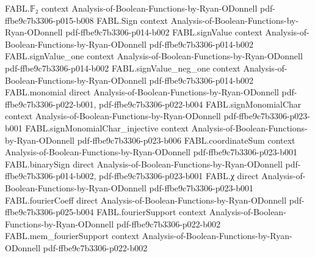 \begin{theorem}
\label{FABL.restrictedWidth_ge_probability_le}
\leanok
{}
\proofstep
  {FABL.𝔽₂}
  {context}
  {Analysis-of-Boolean-Functions-by-Ryan-ODonnell}
  {pdf-ffbe9c7b3306-p015-b008}
\proofstep
  {FABL.Sign}
  {context}
  {Analysis-of-Boolean-Functions-by-Ryan-ODonnell}
  {pdf-ffbe9c7b3306-p014-b002}
\proofstep
  {FABL.signValue}
  {context}
  {Analysis-of-Boolean-Functions-by-Ryan-ODonnell}
  {pdf-ffbe9c7b3306-p014-b002}
\proofstep
  {FABL.signValue_one}
  {context}
  {Analysis-of-Boolean-Functions-by-Ryan-ODonnell}
  {pdf-ffbe9c7b3306-p014-b002}
\proofstep
  {FABL.signValue_neg_one}
  {context}
  {Analysis-of-Boolean-Functions-by-Ryan-ODonnell}
  {pdf-ffbe9c7b3306-p014-b002}
\proofstep
  {FABL.monomial}
  {direct}
  {Analysis-of-Boolean-Functions-by-Ryan-ODonnell}
  {pdf-ffbe9c7b3306-p022-b001,
    pdf-ffbe9c7b3306-p022-b004}
\proofstep
  {FABL.signMonomialChar}
  {context}
  {Analysis-of-Boolean-Functions-by-Ryan-ODonnell}
  {pdf-ffbe9c7b3306-p023-b001}
\proofstep
  {FABL.signMonomialChar_injective}
  {context}
  {Analysis-of-Boolean-Functions-by-Ryan-ODonnell}
  {pdf-ffbe9c7b3306-p023-b006}
\proofstep
  {FABL.coordinateSum}
  {context}
  {Analysis-of-Boolean-Functions-by-Ryan-ODonnell}
  {pdf-ffbe9c7b3306-p023-b001}
\proofstep
  {FABL.binarySign}
  {direct}
  {Analysis-of-Boolean-Functions-by-Ryan-ODonnell}
  {pdf-ffbe9c7b3306-p014-b002,
    pdf-ffbe9c7b3306-p023-b001}
\proofstep
  {FABL.χ}
  {direct}
  {Analysis-of-Boolean-Functions-by-Ryan-ODonnell}
  {pdf-ffbe9c7b3306-p023-b001}
\proofstep
  {FABL.fourierCoeff}
  {direct}
  {Analysis-of-Boolean-Functions-by-Ryan-ODonnell}
  {pdf-ffbe9c7b3306-p025-b004}
\proofstep
  {FABL.fourierSupport}
  {context}
  {Analysis-of-Boolean-Functions-by-Ryan-ODonnell}
  {pdf-ffbe9c7b3306-p022-b002}
\proofstep
  {FABL.mem_fourierSupport}
  {context}
  {Analysis-of-Boolean-Functions-by-Ryan-ODonnell}
  {pdf-ffbe9c7b3306-p022-b002}

\end{theorem}
